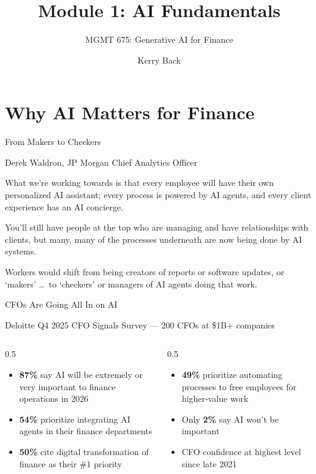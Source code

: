 \documentclass[aspectratio=169]{beamer}
\subtitle{MGMT 675: Generative AI for Finance}
\title{Module 1: AI Fundamentals}
\author{Kerry Back}
\date{}
\begin{document}
\maketitle

\section{Why AI Matters for Finance}

\begin{frame}{From Makers to Checkers}
\centerline{Derek Waldron, JP Morgan Chief Analytics Officer}

What we're working towards is that every employee will have their own personalized AI assistant; every process is powered by AI agents, and every client experience has an AI concierge.

You'll still have people at the top who are managing and have relationships with clients, but many, many of the processes underneath are now being done by AI systems.

Workers would shift from being creators of reports or software updates, or `makers' \ldots\ to `checkers' or managers of AI agents doing that work.
\end{frame}

\begin{frame}{CFOs Are Going All In on AI}
\centerline{Deloitte Q4 2025 CFO Signals Survey --- 200 CFOs at \$1B+ companies}
\vspace{0.3cm}
\begin{columns}[T]
\begin{column}{0.5\textwidth}
\begin{itemize}
  \item \textbf{87\%} say AI will be extremely or very important to finance operations in 2026
  \item \textbf{54\%} prioritize integrating AI agents in their finance departments
  \item \textbf{50\%} cite digital transformation of finance as their \#1 priority
\end{itemize}
\end{column}
\begin{column}{0.5\textwidth}
\begin{itemize}
  \item \textbf{49\%} prioritize automating processes to free employees for higher-value work
  \item Only \textbf{2\%} say AI won't be important
  \item CFO confidence at highest level since late 2021
\end{itemize}
\end{column}
\end{columns}
\end{frame}
\end{document}
